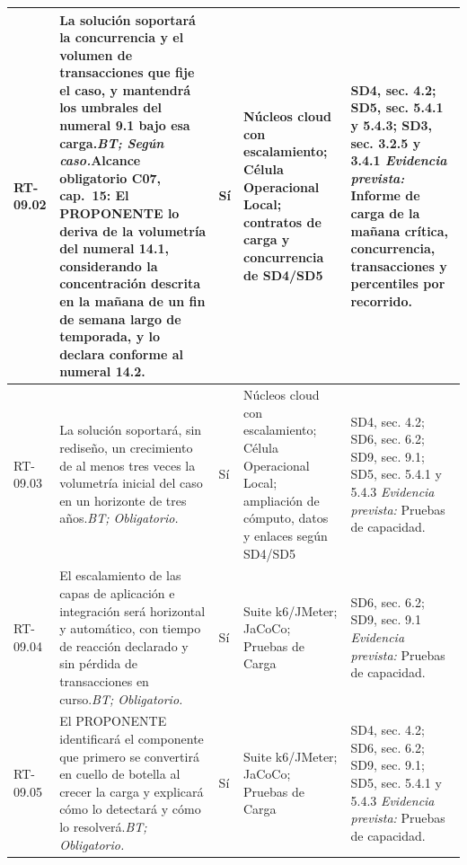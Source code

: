 \begin{paginaHorizontalSynaptix}
\begin{longtable}{|L{0.09\AnchoMatrizTDoce}|L{0.385\AnchoMatrizTDoce}|L{0.065\AnchoMatrizTDoce}|L{0.18\AnchoMatrizTDoce}|L{0.28\AnchoMatrizTDoce}|}
RT-\allowbreak{}09.\allowbreak{}02 &
La solución soportará la concurrencia y el volumen de transacciones que fije el caso, y mantendrá los umbrales del numeral 9.1 bajo esa carga.\newline\textit{BT; Según caso.}\newline\textbf{Alcance obligatorio C07, cap.~15:} El PROPONENTE lo deriva de la volumetría del numeral 14.1, considerando la concentración descrita en la mañana de un fin de semana largo de temporada, y lo declara conforme al numeral 14.2. &
Sí &
Núcleos cloud con escalamiento; Célula Operacional Local; contratos de carga y concurrencia de SD4/SD5 &
SD4, sec. 4.2; SD5, sec. 5.4.1 y 5.4.3; SD3, sec. 3.2.5 y 3.4.1 \newline\textit{Evidencia prevista:} Informe de carga de la mañana crítica, concurrencia, transacciones y percentiles por recorrido. \\ \hline

RT-\allowbreak{}09.\allowbreak{}03 &
La solución soportará, sin rediseño, un crecimiento de al menos tres veces la volumetría inicial del caso en un horizonte de tres años.\newline\textit{BT; Obligatorio.} &
Sí &
Núcleos cloud con escalamiento; Célula Operacional Local; ampliación de cómputo, datos y enlaces según SD4/SD5 &
SD4, sec. 4.2; SD6, sec. 6.2; SD9, sec. 9.1; SD5, sec. 5.4.1 y 5.4.3 \newline\textit{Evidencia prevista:} Pruebas de capacidad. \\ \hline

RT-\allowbreak{}09.\allowbreak{}04 &
El escalamiento de las capas de aplicación e integración será horizontal y automático, con tiempo de reacción declarado y sin pérdida de transacciones en curso.\newline\textit{BT; Obligatorio.} &
Sí &
Suite k6/JMeter; JaCoCo; Pruebas de Carga &
SD6, sec. 6.2; SD9, sec. 9.1 \newline\textit{Evidencia prevista:} Pruebas de capacidad. \\ \hline

RT-\allowbreak{}09.\allowbreak{}05 &
El PROPONENTE identificará el componente que primero se convertirá en cuello de botella al crecer la carga y explicará cómo lo detectará y cómo lo resolverá.\newline\textit{BT; Obligatorio.} &
Sí &
Suite k6/JMeter; JaCoCo; Pruebas de Carga &
SD4, sec. 4.2; SD6, sec. 6.2; SD9, sec. 9.1; SD5, sec. 5.4.1 y 5.4.3 \newline\textit{Evidencia prevista:} Pruebas de capacidad. \\ \hline


\end{longtable}
\end{paginaHorizontalSynaptix}
